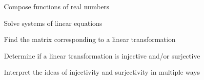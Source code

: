 \begin{readinessAssuranceOutcomes}
\item Compose functions of real numbers
\item Solve systems of linear equations 
\item Find the matrix corresponding to a linear transformation 
\item Determine if a linear transformation is injective and/or surjective 
\item Interpret the ideas of injectivity and surjectivity in multiple ways
\end{readinessAssuranceOutcomes}
